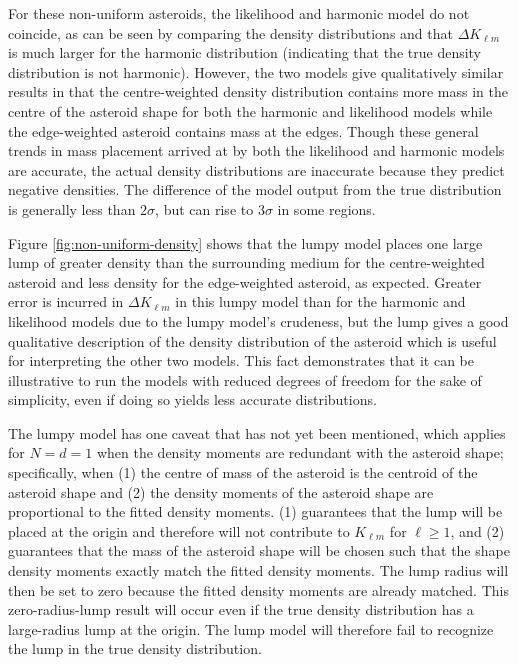 \documentclass[fleqn,usenatbib]{mnras}
\begin{document}
For these non-uniform asteroids, the likelihood and harmonic model do not coincide, as can be seen by comparing the density distributions and that $\Delta K_{\ell m}$ is much larger for the harmonic distribution (indicating that the true density distribution is not harmonic). However, the two models give qualitatively similar results in that the centre-weighted density distribution contains more mass in the centre of the asteroid shape for both the harmonic and likelihood models while the edge-weighted asteroid contains mass at the edges. Though these general trends in mass placement arrived at by both the likelihood and harmonic models are accurate, the actual density distributions are inaccurate because they predict negative densities. The difference of the model output from the true distribution is generally less than $2\sigma$, but can rise to $3\sigma$ in some regions.

Figure \ref{fig:non-uniform-density} shows that the lumpy model places one large lump of greater density than the surrounding medium for the centre-weighted asteroid and less density for the edge-weighted asteroid, as expected. Greater error is incurred in $\Delta K_{\ell m}$ in this lumpy model than for the harmonic and likelihood models due to the lumpy model's crudeness, but the lump gives a good qualitative description of the density distribution of the asteroid which is useful for interpreting the other two models. This fact demonstrates that it can be illustrative to run the models with reduced degrees of freedom for the sake of simplicity, even if doing so yields less accurate distributions.

The lumpy model has one caveat that has not yet been mentioned, which applies for $N=d=1$ when the density moments are redundant with the asteroid shape; specifically, when (1) the centre of mass of the asteroid is the centroid of the asteroid shape and (2) the density moments of the asteroid shape are proportional to the fitted density moments. (1) guarantees that the lump will be placed at the origin and therefore will not contribute to $K_{\ell m}$ for $\ell \geq 1$, and (2) guarantees that the mass of the asteroid shape will be chosen such that the shape density moments exactly match the fitted density moments. The lump radius will then be set to zero because the fitted density moments are already matched. This zero-radius-lump result will occur even if the true density distribution has a large-radius lump at the origin. The lump model will therefore fail to recognize the lump in the true density distribution.
\end{document}
